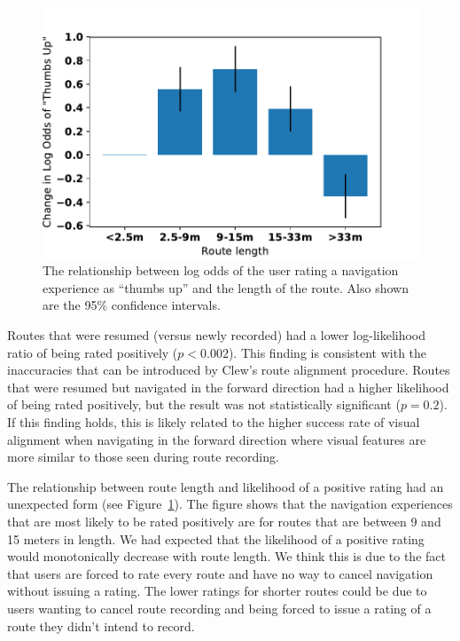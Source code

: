 \documentclass[chi_draft]{sigchi}
\begin{document}
\begin{figure}
\includegraphics[width=\linewidth]{figures/routelength}
\caption{The relationship between log odds of the user rating a navigation experience as ``thumbs up'' and the length of the route.  Also shown are the 95\% confidence intervals.\label{fig:routelength}}
\end{figure}

Routes that were resumed (versus newly recorded) had a lower log-likelihood ratio of being rated positively ($p < 0.002$).  This finding is consistent with the inaccuracies that can be introduced by Clew's route alignment procedure.  Routes that were resumed but navigated in the forward direction had a higher likelihood of being rated positively, but the result was not statistically significant ($p = 0.2$). If this finding holds, this is likely related to the higher success rate of visual alignment when navigating in the forward direction where visual features are more similar to those seen during route recording.


The relationship between route length and likelihood of a positive rating had an unexpected form (see Figure~\ref{fig:routelength}).  The figure shows that the navigation experiences that are most likely to be rated positively are for routes that are between 9 and 15 meters in length. We had expected that the likelihood of a positive rating would monotonically decrease with route length.  We think this is due to the fact that users are forced to rate every route and have no way to cancel navigation without issuing a rating.  The lower ratings for shorter routes could be due to users wanting to cancel route recording and being forced to issue a rating of a route they didn't intend to record.
\end{document}
